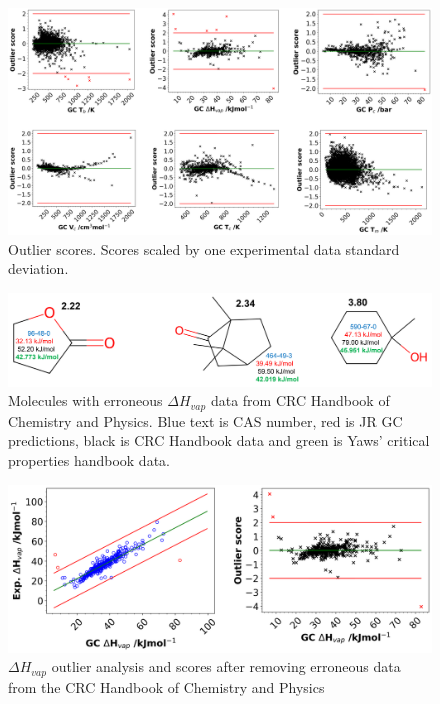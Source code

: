 \documentclass[journal=jacsat,manuscript=article]{achemso}
\begin{document}
\begin{figure}[H]
    \centering
    \includegraphics[width=1\linewidth]{images/outlier_score.png}
    \caption{Outlier scores. Scores scaled by one experimental data standard deviation.}
    \label{fig:outlier_scores}
\end{figure}




\begin{figure}[H]
    \centering
    \includegraphics[width=1\linewidth]{images/bad_data_Hvap_molecules.png}
    \caption{Molecules with erroneous $\Delta$$H_{vap}$ data from CRC Handbook of Chemistry and Physics. Blue text is CAS number, red is JR GC predictions, black is CRC Handbook data and green is Yaws' critical properties handbook data.}
    \label{fig:molecules_with_erroneous_data}
\end{figure}


\begin{figure}[H]
    \centering
    \includegraphics[width=0.5\linewidth]{images/Hvap_outlier_analysis_scores.png}
    \caption{$\Delta$$H_{vap}$  outlier analysis and scores after removing erroneous data from the CRC Handbook of Chemistry and Physics}
    \label{fig:enter-label}
\end{figure}
\end{document}
